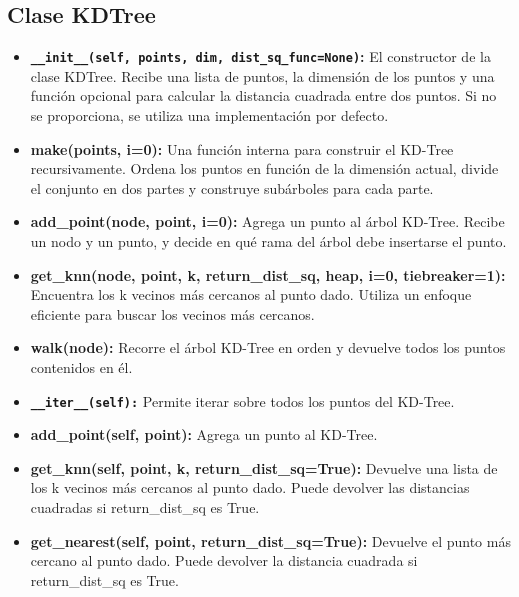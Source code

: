 \documentclass[]{article}
\begin{document}
\subsection{Clase KDTree}
\begin{itemize}
	\item \textbf{\lstinline|__init__(self, points, dim, dist_sq_func=None)|:} El constructor de la clase KDTree. Recibe una lista de puntos, la dimensión de los puntos y una función opcional para calcular la distancia cuadrada entre dos puntos. Si no se proporciona, se utiliza una implementación por defecto.
	\item \textbf{make(points, i=0):} Una función interna para construir el KD-Tree recursivamente. Ordena los puntos en función de la dimensión actual, divide el conjunto en dos partes y construye subárboles para cada parte.
	\item \textbf{add\_point(node, point, i=0):} Agrega un punto al árbol KD-Tree. Recibe un nodo y un punto, y decide en qué rama del árbol debe insertarse el punto.
	\item \textbf{get\_knn(node, point, k, return\_dist\_sq, heap, i=0, tiebreaker=1):} Encuentra los k vecinos más cercanos al punto dado. Utiliza un enfoque eficiente para buscar los vecinos más cercanos.
	\item \textbf{walk(node):} Recorre el árbol KD-Tree en orden y devuelve todos los puntos contenidos en él.
	\item \textbf{\lstinline|__iter__(self):|} Permite iterar sobre todos los puntos del KD-Tree.
	\item \textbf{add\_point(self, point):} Agrega un punto al KD-Tree.
	\item \textbf{get\_knn(self, point, k, return\_dist\_sq=True):} Devuelve una lista de los k vecinos más cercanos al punto dado. Puede devolver las distancias cuadradas si return\_dist\_sq es True.
	\item \textbf{get\_nearest(self, point, return\_dist\_sq=True):} Devuelve el punto más cercano al punto dado. Puede devolver la distancia cuadrada si return\_dist\_sq es True.
\end{itemize}
\end{document}
